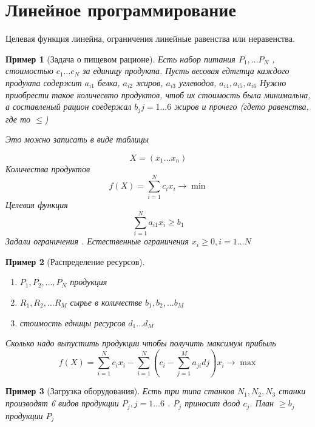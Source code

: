 \documentclass[14pt]{extarticle}
\newtheorem{example}{Пример}
\begin{document}
  \section{Линейное программирование}
  Целевая функция линейна, ограничения линейные равенства или неравенства.
  \begin{example}[Задача о пищевом рационе]
	  Есть набор питания $P_1,\dots P_{N}$ ,
	  стоимостью $c_1 \dots c_{N}$ 
	  за единицу продукта. Пусть
	  весовая едтгтца каждого продукта
	  содержит $a_{i1}$ белка, $a_{i 2}$ жиров,
	  $a_{i 3}$ углеводов, $a_{i 4}, a_{i 5}, a_{i 6}$ 
	  Нужно приобрести такое количесвто продуктов, чтоб
	  их стоимость была минимальна, а составленый рацион соедержал $b_{j} j = 1 \dots 6$ жиров и прочего (гдето равенства, где то $\le $)

	  Это можно записать в виде таблицы

	  \begin{equation}
	  X = (x_1 \dots x_{n})
	  \end{equation} 
	  Количества продуктов
	  \begin{equation}
	  f(X) = \sum_{i= 1}^{N} c_{i} x_{i} \to \min
	  \end{equation} 
	  Целевая функция
	  \begin{equation}
	  \sum_{i =1}^{N} a_{i 1} x_{i} \ge  b_1
	  \end{equation} 
	  Задали ограничения .  Естественные ограничения $x_{i}\ge 0, i =1 \dots N$
  \end{example}
  \begin{example}[Распределение ресурсов]
		\begin{enumerate}
			\item $P_1,P_2,\dots,P_{N}$ 
				продукция
			\item $R_1,R_2,\dots R_{M}$ сырье в количестве 
				$b_1,b_2,\dots b_{M}$ 
			\item стоимость едницы ресурсов $d_1 \dots d_{M}$
		\end{enumerate}
		Сколько надо выпустить продукции чтобы получить
		максимум прибыль
		\begin{equation}
		f(X) = \sum_{i =1}^{N} c_{i} x_{i} -
		\sum_{i = 1}^{N} \left( c_{i} - \sum_{j=1}^{M} a_{ji} dj\right) x_{i} \to \max
		\end{equation} 
  \end{example}
  \begin{example}[Загрузка оборудования]
	  Есть три типа станков $N_1,N_2,N_3$
	  станки производят 6 видов продукции $P_{j},j=1 \dots 6$ . $P_{j}$ приносит доод $c_{j}$. 
	  План $\ge   b_{j}$ продукции $P_{j}$
  \end{example}
\end{document}
